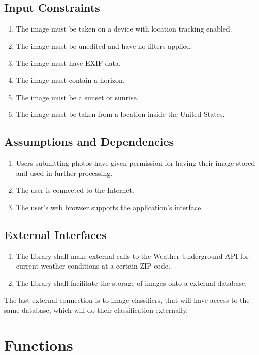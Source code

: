 \documentclass[journal,10pt,draftclsnofoot,onecolumn]{IEEEtran}
\begin{document}
\begin{singlespace}
	\subsection{Input Constraints}
		\begin{enumerate}
			\item The image must be taken on a device with location tracking enabled.
			\item The image must be unedited and have no filters applied.
			\item The image must have EXIF data.
			\item The image must contain a horizon.
			\item The image must be a sunset or sunrise.
			\item The image must be taken from a location inside the United States.
		\end{enumerate}

	\subsection{Assumptions and Dependencies}
		\begin{enumerate}
			\item Users submitting photos have given permission for having their image stored and used in further processing.
			\item The user is connected to the Internet.
			\item The user's web browser supports the application's interface.
		\end{enumerate}

	\subsection{External Interfaces}
		\begin{enumerate}
			\item The library shall make external calls to the Weather Underground API for current weather conditions at a certain ZIP code.
			\item The library shall facilitate the storage of images onto a external database.\\
		\end{enumerate}
		The last external connection is to image classifiers, that will have access to the same database, which will do their classification externally.

\clearpage

\section{Functions}

\end{singlespace}
\end{document}

